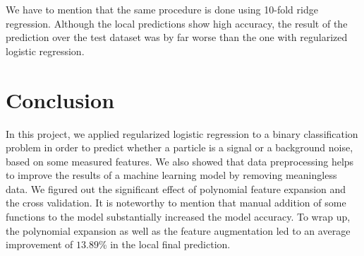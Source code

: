 \documentclass[8pt,conference,compsocconf]{IEEEtran}
\begin{document}
We have to mention that the same procedure is done using 10-fold ridge regression. Although the local predictions show high accuracy, the result of the prediction over the test dataset was by far worse than the one with regularized logistic regression.


\section{Conclusion} \label{sec:conclusion}
In this project, we applied regularized logistic regression to a binary classification problem in order to predict whether a particle is a signal or a background noise, based on some measured features. We also showed that data preprocessing helps to improve the results of a machine learning model by removing meaningless data. We figured out the significant effect of polynomial feature expansion and the cross validation. It is noteworthy to mention that manual addition of some functions to the model substantially increased the model accuracy. To wrap up, the polynomial expansion as well as the feature augmentation led to an average improvement of $13.89$\% in the local final prediction.



\end{document}
